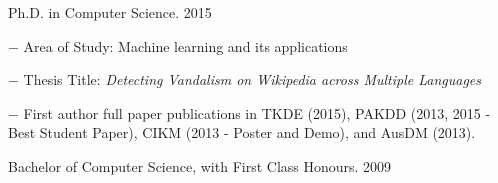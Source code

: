 \documentclass[10pt]{article}
\renewcommand{\section}[1]{\pagebreak[3]%
    \hyphenpenalty=10000%
    \vspace{1.3\baselineskip}%
    \phantomsection\addcontentsline{toc}{section}{#1}%
    \noindent\llap{\scshape\smash{\parbox[t]{\marginparwidth}{\raggedright #1}}}%
    \vspace{-\baselineskip}\par}
\begin{document}
\begin{outerlist}
\item Ph.D. in Computer Science. \hfill 2015
	\begin{innerlist}
		\item[$-$] Area of Study: Machine learning and its applications
		\item[$-$] Thesis Title: \emph{Detecting Vandalism on Wikipedia across Multiple Languages}
		\item[$-$] First author full paper publications in TKDE (2015), PAKDD (2013, 2015 - Best Student Paper), CIKM (2013 - Poster and Demo), and AusDM (2013).
	\end{innerlist}

\item Bachelor of Computer Science, with First Class Honours. \hfill 2009
\end{outerlist}

\begin{comment}
\section{Service}

\href{http://cs.club.anu.edu.au}{\textbf{ANU Computer Science Students' Association}}
\begin{innerlist}
    \item Volunteer, 2007--2010
	\item President, 2011--2012
	\begin{innerlist}
		\item[$-$] Total membership for 2011: 220+, for 2012: 300+.
		\item[$-$] Notable events: 20+ BBQs, 4 Epic Games Nights, 8 technical talks (incl. Kinect development workshop), 4 software installation events, and 2 membership recruitments.
		\item[$-$] Winner of ``Event of the Year'' in 2012 for the Epic Games Night.
		\item[$-$] Runner up for ``Club of the Year'' in 2012.
	\end{innerlist}
    \item \href{http://www.microsoftstudentpartners.com/}{Microsoft Student Ambassador}, 2011--2012
\end{innerlist}
\end{comment}
\end{document}
